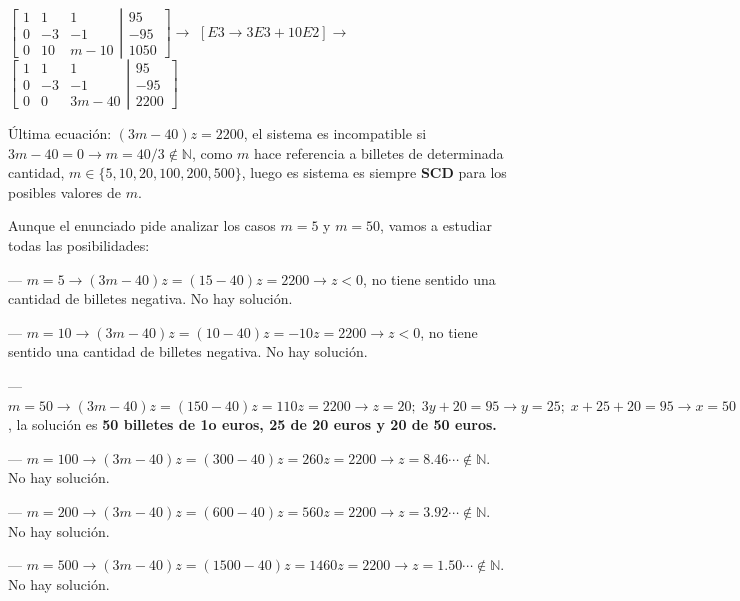 \begin{proofw}
\noindent $\left[ \begin{matrix}
  1 & 1 & 1 \\ 0 & -3 & -1 \\ 0 & 10 & m-10 
 \end{matrix}\right. 
 \left| \begin{matrix}
  95 \\ -95 \\ 1050 
 \end{matrix}\right] \to $
 \textcolor{gris}{$[E3 \to 3E3+10E2] \to $}
  $\left[ \begin{matrix}
  1 & 1 & 1 \\ 0 & -3 & -1 \\ 0 & 0 & 3m-40 
 \end{matrix}\right. 
 \left| \begin{matrix}
  95 \\ -95 \\ 2200
 \end{matrix}\right]  $
 
 Última ecuación: $(3m-40)z=2200$, el sistema es incompatible si $3m-40=0\to m=40/3 \notin \mathbb N$, como $m$ hace referencia a billetes de determinada cantidad, $m \in \{5,10,20,100, 200, 500\}$, luego es sistema es siempre \textbf{SCD} para los posibles valores de $m$.
 
 Aunque el enunciado pide analizar los casos $m=5$ y $m=50$, vamos a estudiar todas las posibilidades:
 
\noindent  --- $m=5 \to (3m-40)z=(15-40)z=2200\to z<0$, no tiene sentido una cantidad de billetes negativa.  No hay solución.
 
\noindent  --- $m=10 \to (3m-40)z=(10-40)z=-10z=2200\to z<0$, no tiene sentido una cantidad de billetes negativa.  No hay solución.
 
  
\noindent  --- $m=50 \to (3m-40)z=(150-40)z=110z=2200\to z=20; \; 3y+20=95\to y=25; \; x+25+20=95 \to x=50$, la solución es \textbf{50 billetes de 1o euros, 25 de 20 euros y 20 de 50 euros.}
 
\noindent  --- $m=100 \to (3m-40)z=(300-40)z=260z=2200 \to z=8.46\cdots \notin \mathbb N$. No hay solución.
 
 \noindent  --- $m=200 \to (3m-40)z=(600-40)z=560z=2200 \to z=3.92\cdots \notin \mathbb N$. No hay solución.
  
\noindent  --- $m=500 \to (3m-40)z=(1500-40)z=1460z=2200 \to z=1.50\cdots \notin \mathbb N$. No hay solución.
\end{proofw}

